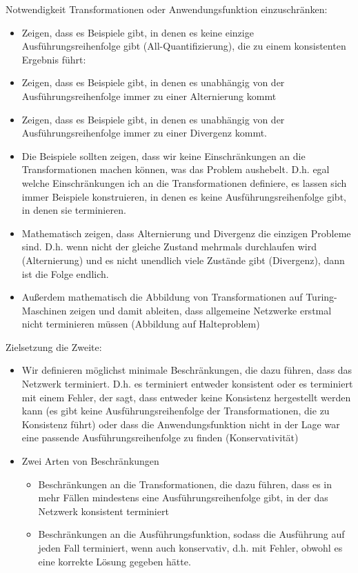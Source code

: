 Notwendigkeit Transformationen oder Anwendungsfunktion einzuschränken:
\begin{itemize}
    \item Zeigen, dass es Beispiele gibt, in denen es keine einzige Ausführungsreihenfolge gibt (All-Quantifizierung), die zu einem konsistenten Ergebnis führt:
    \item Zeigen, dass es Beispiele gibt, in denen es unabhängig von der Ausführungsreihenfolge immer zu einer Alternierung kommt
    \item Zeigen, dass es Beispiele gibt, in denen es unabhängig von der Ausführungsreihenfolge immer zu einer Divergenz kommt.
    \item Die Beispiele sollten zeigen, dass wir keine Einschränkungen an die Transformationen machen können, was das Problem aushebelt. D.h. egal welche Einschränkungen ich an die Transformationen definiere, es lassen sich immer Beispiele konstruieren, in denen es keine Ausführungsreihenfolge gibt, in denen sie terminieren.
    \item Mathematisch zeigen, dass Alternierung und Divergenz die einzigen Probleme sind. D.h. wenn nicht der gleiche Zustand mehrmals durchlaufen wird (Alternierung) und es nicht unendlich viele Zustände gibt (Divergenz), dann ist die Folge endlich.
    \item Außerdem mathematisch die Abbildung von Transformationen auf Turing-Maschinen zeigen und damit ableiten, dass allgemeine Netzwerke erstmal nicht terminieren müssen (Abbildung auf Halteproblem)
\end{itemize}

Zielsetzung die Zweite:
\begin{itemize}
    \item Wir definieren möglichst minimale Beschränkungen, die dazu führen, dass das Netzwerk terminiert. D.h. es terminiert entweder konsistent oder es terminiert mit einem Fehler, der sagt, dass entweder keine Konsistenz hergestellt werden kann (es gibt keine Ausführungsreihenfolge der Transformationen, die zu Konsistenz führt) oder dass die Anwendungsfunktion nicht in der Lage war eine passende Ausführungsreihenfolge zu finden (Konservativität)
    \item Zwei Arten von Beschränkungen
    \begin{itemize}
        \item Beschränkungen an die Transformationen, die dazu führen, dass es in mehr Fällen mindestens eine Ausführungsreihenfolge gibt, in der das Netzwerk konsistent terminiert
        \item Beschränkungen an die Ausführungsfunktion, sodass die Ausführung auf jeden Fall terminiert, wenn auch konservativ, d.h. mit Fehler, obwohl es eine korrekte Lösung gegeben hätte.
    \end{itemize}
\end{itemize}



